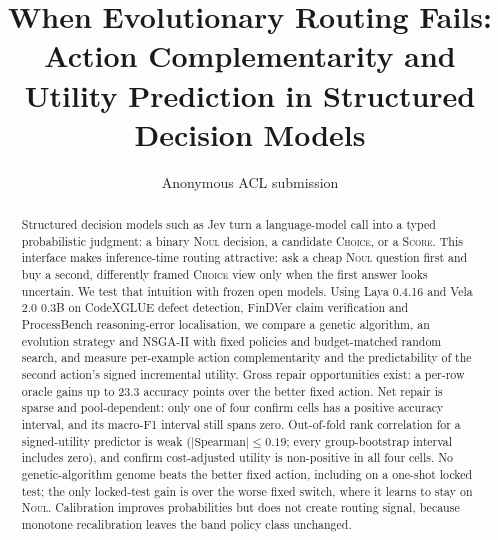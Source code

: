 \documentclass[11pt]{article}
\title{When Evolutionary Routing Fails:\\ Action Complementarity and Utility Prediction in Structured Decision Models}
\author{Anonymous ACL submission}
\newcommand{\noul}{\textsc{Noul}}
\newcommand{\choice}{\textsc{Choice}}
\newcommand{\score}{\textsc{Score}}
\begin{document}
\maketitle

\begin{abstract}
Structured decision models such as Jev turn a language-model call into a typed
probabilistic judgment: a binary \noul{} decision, a candidate \choice{}, or a
\score{}. This interface makes inference-time routing attractive: ask a cheap
\noul{} question first and buy a second, differently framed \choice{} view only
when the first answer looks uncertain. We test that intuition with frozen open
models. Using Laya 0.4.16 and Vela 2.0 0.3B on CodeXGLUE defect detection,
FinDVer claim verification and ProcessBench reasoning-error localisation, we
compare a genetic algorithm, an evolution strategy and NSGA-II with fixed
policies and budget-matched random search, and measure per-example action
complementarity and the predictability of the second action's signed
incremental utility. Gross repair opportunities exist: a per-row oracle gains
up to 23.3 accuracy points over the better fixed action. Net repair is sparse
and pool-dependent: only one of four confirm cells has a positive accuracy
interval, and its macro-F1 interval still spans zero. Out-of-fold rank
correlation for a signed-utility predictor is weak ($|\text{Spearman}|\le
0.19$; every group-bootstrap interval includes zero), and confirm cost-adjusted
utility is non-positive in all four cells. No genetic-algorithm genome beats
the better fixed action, including on a one-shot locked test; the only
locked-test gain is over the worse fixed switch, where it learns to stay on
\noul{}. Calibration improves probabilities but does not create routing signal,
because monotone recalibration leaves the band policy class unchanged.
\end{abstract}








{\footnotesize
}
\end{document}

